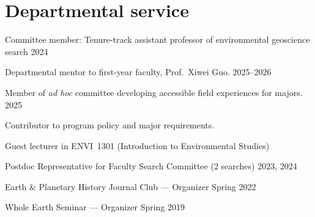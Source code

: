 \section{Departmental service}


Committee member: Tenure-track assistant professor of environmental geoscience search \hfill 2024

Departmental mentor to first-year faculty, Prof.~Xiwei Guo. \hfill 2025--2026

Member of \textit{ad hoc} committee developing accessible field experiences for majors. \hfill 2025\ongoing


Contributor to program policy and major requirements.

Guest lecturer in ENVI~1301 (Introduction to Environmental Studies)


Postdoc Representative for Faculty Search Committee (2 searches) \hfill 2023, 2024

Earth \& Planetary History Journal Club --- Organizer 	 \hfill	Spring 2022

Whole Earth Seminar --- Organizer \hfill  Spring 2019